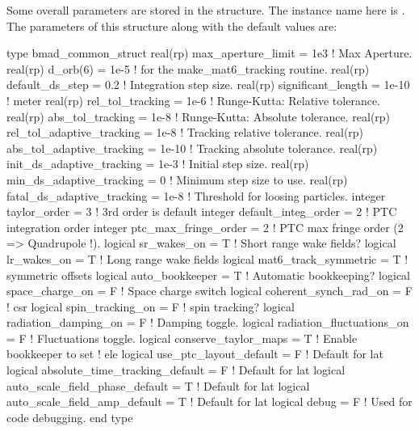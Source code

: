 Some overall parameters are stored in the 
structure. The instance name here is . The parameters of
this structure along with the default values are:
\begin{example}
  type bmad_common_struct
    real(rp) max_aperture_limit = 1e3          ! Max Aperture.
    real(rp) d_orb(6)           = 1e-5         ! for the make_mat6_tracking routine.
    real(rp) default_ds_step    = 0.2          ! Integration step size.  
    real(rp) significant_length = 1e-10        ! meter 
    real(rp) rel_tol_tracking = 1e-6           ! Runge-Kutta: Relative tolerance.
    real(rp) abs_tol_tracking = 1e-8           ! Runge-Kutta: Absolute tolerance.
    real(rp) rel_tol_adaptive_tracking = 1e-8  ! Tracking relative tolerance.
    real(rp) abs_tol_adaptive_tracking = 1e-10 ! Tracking absolute tolerance.
    real(rp) init_ds_adaptive_tracking = 1e-3  ! Initial step size.
    real(rp) min_ds_adaptive_tracking = 0      ! Minimum step size to use.
    real(rp) fatal_ds_adaptive_tracking = 1e-8 ! Threshold for loosing particles.
    integer taylor_order = 3                   ! 3rd order is default
    integer default_integ_order = 2            ! PTC integration order
    integer ptc_max_fringe_order = 2           ! PTC max fringe order (2 => Quadrupole !).
    logical sr_wakes_on = T                    ! Short range wake fields?
    logical lr_wakes_on = T                    ! Long range wake fields
    logical mat6_track_symmetric = T           ! symmetric offsets
    logical auto_bookkeeper = T                ! Automatic bookkeeping?
    logical space_charge_on = F                ! Space charge switch
    logical coherent_synch_rad_on = F          ! csr 
    logical spin_tracking_on = F               ! spin tracking?
    logical radiation_damping_on = F           ! Damping toggle.
    logical radiation_fluctuations_on = F      ! Fluctuations toggle.
    logical conserve_taylor_maps = T           ! Enable bookkeeper to set
                                               ! ele%
    logical use_ptc_layout_default = F         ! Default for lat%
    logical absolute_time_tracking_default = F ! Default for lat%
    logical auto_scale_field_phase_default = T    ! Default for lat%
    logical auto_scale_field_amp_default = T      ! Default for lat%
    logical debug = F                          ! Used for code debugging.
  end type
\end{example}

